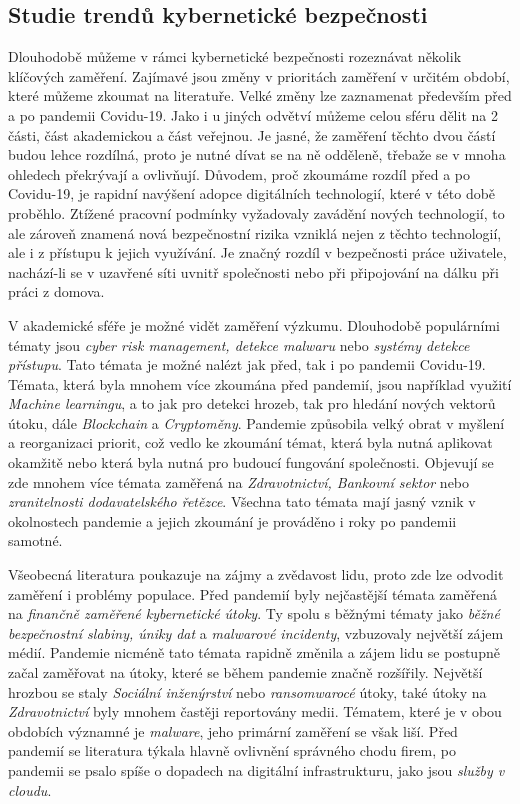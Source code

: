 \subsection{Studie trendů kybernetické bezpečnosti}\label{subsec:studie-trendu-kyberneticke-bezpecnosti}
Dlouhodobě můžeme v rámci kybernetické bezpečnosti rozeznávat několik klíčových zaměření.
Zajímavé jsou změny v prioritách zaměření v určitém období, které můžeme zkoumat na literatuře.
Velké změny lze zaznamenat především před a po pandemii Covidu-19.\cite{KUMAR2022102821}
Jako i u jiných odvětví můžeme celou sféru dělit na 2 části, část akademickou a část veřejnou.
Je jasné, že zaměření těchto dvou částí budou lehce rozdílná, proto je nutné dívat se na ně odděleně, třebaže se v mnoha ohledech překrývají a ovlivňují.
Důvodem, proč zkoumáme rozdíl před a po Covidu-19, je rapidní navýšení adopce digitálních technologií, které v této době proběhlo.
Ztížené pracovní podmínky vyžadovaly zavádění nových technologií, to ale zároveň znamená nová bezpečnostní rizika vzniklá nejen z těchto technologií, ale i z přístupu k jejich využívání.
Je značný rozdíl v bezpečnosti práce uživatele, nachází-li se v uzavřené síti uvnitř společnosti nebo při připojování na dálku při práci z domova.

V akademické sféře je možné vidět zaměření výzkumu.
Dlouhodobě populárními tématy jsou \textit{cyber risk management, detekce malwaru} nebo \textit{systémy detekce přístupu}.\cite{KUMAR2022102821}
Tato témata je možné nalézt jak před, tak i po pandemii Covidu-19.
Témata, která byla mnohem více zkoumána před pandemií, jsou například využití \textit{Machine learningu}, a to jak pro detekci hrozeb, tak pro hledání nových vektorů útoku, dále \textit{Blockchain} a \textit{Cryptoměny}.\cite{KUMAR2022102821}
Pandemie způsobila velký obrat v myšlení a reorganizaci priorit, což vedlo ke zkoumání témat, která byla nutná aplikovat okamžitě nebo která byla nutná pro budoucí fungování společnosti.
Objevují se zde mnohem více témata zaměřená na \textit{Zdravotnictví, Bankovní sektor} nebo \textit{zranitelnosti dodavatelského řetězce}.\cite{KUMAR2022102821}
Všechna tato témata mají jasný vznik v okolnostech pandemie a jejich zkoumání je prováděno i roky po pandemii samotné.

Všeobecná literatura poukazuje na zájmy a zvědavost lidu, proto zde lze odvodit zaměření i problémy populace.
Před pandemií byly nejčastější témata zaměřená na \textit{finančně zaměřené kybernetické útoky}.
Ty spolu s běžnými tématy jako \textit{běžné bezpečnostní slabiny, úniky dat} a \textit{malwarové incidenty}, vzbuzovaly největší zájem médií.\cite{KUMAR2022102821}
Pandemie nicméně tato témata rapidně změnila a zájem lidu se postupně začal zaměřovat na útoky, které se během pandemie značně rozšířily.
Největší hrozbou se staly \textit{Sociální inženýrství} nebo \textit{ransomwarocé} útoky, také útoky na \textit{Zdravotnictví} byly mnohem častěji reportovány medii.
Tématem, které je v obou obdobích významné je \textit{malware}, jeho primární zaměření se však liší.
Před pandemií se literatura týkala hlavně ovlivnění správného chodu firem, po pandemii se psalo spíše o dopadech na digitální infrastrukturu, jako jsou \textit{služby v cloudu}.

